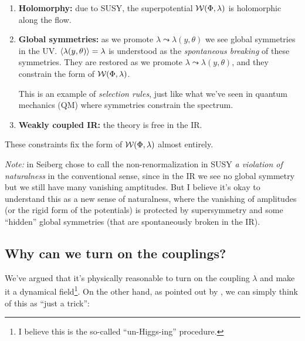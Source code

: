 \documentclass[a4paper
	,10pt
]{article}
\begin{document}
{\begin{enumerate}
		\begin{enumerate}
		\item \textbf{Holomorphy:} due to SUSY, the superpotential $\mathcal{W}(\Phi,\lambda)$ is holomorphic along the flow.
		
		\pagebreak[3]
		
		\item \textbf{Global symmetries:} as we promote $\lambda\leadsto\lambda(y,\theta)$ we see global symmetries in the UV. $\langle\lambda(y,\theta)\rangle = \lambda$ is understood as the \textit{spontaneous breaking} of these symmetries. They are restored as we promote $\lambda\leadsto\lambda(y,\theta)$, and they constrain the form of $\mathcal{W}(\Phi,\lambda)$. 
		
		This is an example of \textit{selection rules}, just like what we've seen in quantum mechanics (QM) where symmetries constrain the spectrum. 
		
		\item \textbf{Weakly coupled IR:} the theory is free in the IR.
		\end{enumerate}
	
	These constraints fix the form of $\mathcal{W}(\Phi,\lambda)$ almost entirely. 
	\end{enumerate}
}
	
	\textit{Note:} in \cite{Seiberg:1993vc} Seiberg chose to call the non-renormalization in SUSY \textit{a violation of naturalness} in the conventional sense, since in the IR we see no global symmetry but we still have many vanishing amptitudes. But I believe it's okay to understand this as a new sense of naturalness, where the vanishing of amplitudes (or the rigid form of the potentials) is protected by supersymmetry and some ``hidden'' global symmetries (that are spontaneously broken in the IR). 
	
\subsection{Why can we turn on the couplings?}
	We've argued that it's physically reasonable to turn on the coupling $\lambda$ and make it a dynamical field\footnote{
		I believe this is the so-called ``un-Higgs-ing'' procedure.
	}. On the other hand, as pointed out by \textcite{Argyres:1996abc}, we can simply think of this as ``just a trick'':
	
\end{document}

